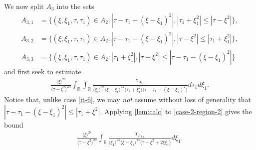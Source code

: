 \documentclass[12pt,reqno]{amsart}
\numberwithin{equation}{section}  %
\numberwithin{figure}{section}
\newcommand{\rr}{\mathbb{R}}
\theoremstyle{plain}
\theoremstyle{definition}
\theoremstyle{remark}
\begin{document}
%
%
We now split $A_{3}$ into the sets
%
%
%
\begin{align*}
A_{3,1}&=\{(\xi, \xi_1, \tau, \tau_1)\in A_2:
|\tau-\tau_1-(\xi-\xi_1)^2|, |\tau_1+\xi_1^2| \le |\tau-\xi^2|\},\\
A_{3,2}&=\{(\xi, \xi_1, \tau, \tau_1)\in A_2:
|\tau-\tau_1-(\xi-\xi_1)^2|, |\tau-\xi^2| \le |\tau_1+\xi_1^2|\},\\
A_{3,3}&=\{(\xi, \xi_1, \tau, \tau_1)\in A_2: |\tau_{1}+\xi_{1}^2|, | \tau - \xi^{2} | \le |  \tau - \tau_{1} -
(\xi - \xi_{1})^{2} |\}
\end{align*} 
and first seek to estimate
%
%
\begin{equation}
  \label{case-2-region-2}
  \begin{split}
    \frac{ \langle \xi
    \rangle ^{2s}}{\langle \tau - \xi^{2} \rangle ^{2a}}
    \int_{\rr} \int_{\rr} \frac{\chi_{A_{3,1}}}{ \langle \xi_{1} \rangle ^{2s} \langle \xi-\xi_{1} \rangle ^{2s} 
    \langle \tau_{1} + \xi_{1}^{2} \rangle \langle  \tau - \tau_{1} -
    (\xi - \xi_{1})^{2} \rangle }
    d \tau_1 d \xi_{1}.
  \end{split}
\end{equation}
Notice that, unlike case \eqref{it-6}, we may \emph{not} assume without loss of generality
that $|\tau - \tau_{1} - (\xi - \xi_1)^{2} | \le | \tau_{1} + \xi^{2} | $.
Applying \autoref{lem:calc} to \eqref{case-2-region-2} gives the bound
%
%
\begin{equation*}
  \begin{split}
    \frac{ \langle \xi
    \rangle ^{2s}}{\langle \tau - \xi^{2} \rangle ^{2a}}
    \int_{\rr} \frac{\chi_{A_{3,1}}}{ \langle \xi_{1} \rangle ^{2s} \langle \xi-\xi_{1} \rangle ^{2s} 
    \langle \tau - \xi^{2} +2 \xi \xi_{1} \rangle } d \xi_{1}.
  \end{split}
\end{equation*}
\end{document}
